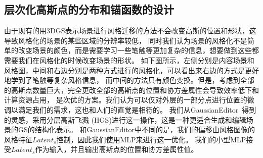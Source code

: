 \subsection{层次化高斯点的分布和锚函数的设计}
由于现有的用3DGS表示场景进行风格迁移的方法不会改变高斯的位置和形状，这导致风格化的场景的某些区域的分辨率较低，
同时我们认为场景的风格化不是简单的改变场景的颜色，而是需要学习一些笔触等更加复杂的信息，想要做到这些都需要我们在风格化的时候改变场景的形状。
如下图所示，左侧分别是内容场景和风格图，中间和右边分别是两种方式进行的风格化，可以看出来右边的方式是更好地学到了笔触等复杂风格信息，
而中间的方法只有颜色变换。但是，考虑到全部的高斯点数量巨大，完全更改全部的高斯点的位置和协方差属性会导致效率低下和计算资源占用，
是次优的方案。我们认为可以仅对外层的一部分点进行位置的微调以满足我们的需求，这也和人们的直觉是相符的。
我们从GaussianEditor~\cite{chen2024gaussianeditor}得到的灵感，采用分层高斯飞溅 (HGS)进行这一操作，这是一种更适合生成和编辑场景的GS的结构化表示。
和GaussianEditor中不同的是，我们的偏移由风格图像的风格特征$Latent_s$控制，因此我们使用MLP来进行这一优化。
我们的小型MLP接受$Latent_s$作为输入，并且输出高斯点的位置和协方差属性值。




